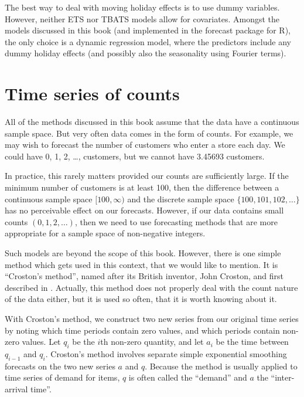 \documentclass[]{book}
\begin{document}
The best way to deal with moving holiday effects is to use dummy variables. However, neither ETS nor TBATS models allow for covariates. Amongst the models discussed in this book (and implemented in the forecast package for R), the only choice is a dynamic regression model, where the predictors include any dummy holiday effects (and possibly also the seasonality using Fourier terms).

\hypertarget{counts}{%
\section{Time series of counts}\label{counts}}

All of the methods discussed in this book assume that the data have a continuous sample space. But very often data comes in the form of counts. For example, we may wish to forecast the number of customers who enter a store each day. We could have 0, 1, 2, \dots, customers, but we cannot have 3.45693 customers.

In practice, this rarely matters provided our counts are sufficiently large. If the minimum number of customers is at least 100, then the difference between a continuous sample space \([100,\infty)\) and the discrete sample space \(\{100,101,102,\dots\}\) has no perceivable effect on our forecasts. However, if our data contains small counts \((0, 1, 2, \dots)\), then we need to use forecasting methods that are more appropriate for a sample space of non-negative integers.

Such models are beyond the scope of this book. However, there is one simple method which gets used in this context, that we would like to mention. It is ``Croston's method'', named after its British inventor, John Croston, and first described in \citet{Croston72}. Actually, this method does not properly deal with the count nature of the data either, but it is used so often, that it is worth knowing about it.

With Croston's method, we construct two new series from our original time series by noting which time periods contain zero values, and which periods contain non-zero values. Let \(q_i\) be the \(i\)th non-zero quantity, and let \(a_i\) be the time between \(q_{i-1}\) and \(q_i\). Croston's method involves separate simple exponential smoothing forecasts on the two new series \(a\) and \(q\). Because the method is usually applied to time series of demand for items, \(q\) is often called the ``demand'' and \(a\) the ``inter-arrival time''.
\end{document}
